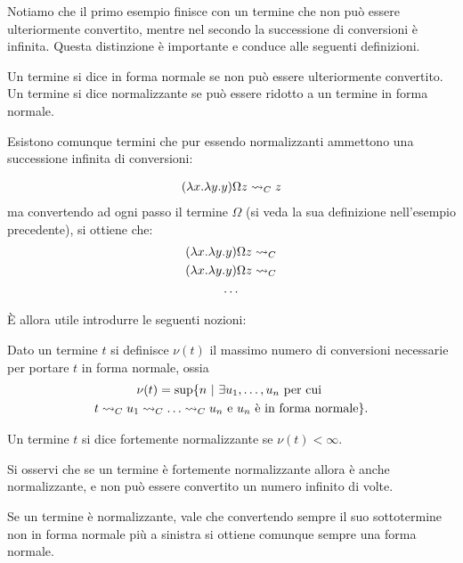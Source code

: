 \documentclass[]{marticle}
\begin{document}
Notiamo che il primo esempio finisce con un termine che non pu\`o essere
ulteriormente convertito, mentre nel secondo la successione di conversioni \`e
infinita. Questa distinzione \`e importante e conduce alle seguenti definizioni.

\begin{block}[Definizione]
    Un termine si dice in forma normale se non pu\`o essere ulteriormente
    convertito. Un termine si dice normalizzante se pu\`o essere ridotto a un
    termine in forma normale.
\end{block}

Esistono comunque termini che pur essendo normalizzanti ammettono una
successione infinita di conversioni:

\begin{block}[Esempio]
    \begin{gather*}
        (\lambda x . \lambda y. y)\Omega z \rightsquigarrow_C z
    \end{gather*}
    ma convertendo ad ogni passo il termine $\Omega$ (si veda la sua definizione
    nell'esempio precedente), si ottiene che:
    \begin{gather*}
        (\lambda x . \lambda y. y)\Omega z \rightsquigarrow_C \\ 
        (\lambda x . \lambda y. y)\Omega z \rightsquigarrow_C \\
        \dots
    \end{gather*}
\end{block}

\`E allora utile introdurre le seguenti nozioni:
\begin{block}[Definizione]
    Dato un termine $t$ si definisce $\nu(t)$ il massimo numero di conversioni
    necessarie per portare $t$ in forma normale, ossia
    \begin{gather*}
        \nu (t) = \sup \setof { n \st
            \exists u_1, \dots, u_n \text{ per cui } \\
            t \conv_C u_1 \conv_C \dots
            \conv_C u_n \text{ e $u_n$ \`e in forma normale}
        }.
    \end{gather*}

    Un termine $t$ si dice fortemente normalizzante se $\nu(t) < \infty$.
\end{block}

Si osservi che se un termine \`e fortemente normalizzante allora \`e anche
normalizzante, e non pu\`o essere convertito un numero infinito di volte.

Se un termine \`e normalizzante, vale che convertendo sempre il suo sottotermine
non in forma normale pi\`u a sinistra si ottiene comunque sempre una forma
normale.
\end{document}
